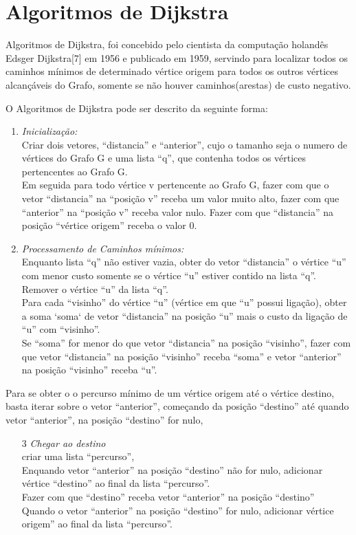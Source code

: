 \documentclass[a4paper,10pt]{article}
\begin{document}
\section{Algoritmos de Dijkstra}{
    

 Algoritmos de Dijkstra\cite{4}, foi concebido pelo cientista da computação holandês Edsger Dijkstra[7] em 1956 e publicado em 1959, servindo para localizar todos os caminhos mínimos
de determinado vértice origem para todos os outros vértices alcançáveis do Grafo, somente se não houver caminhos(arestas) de custo negativo.


O Algoritmos de Dijkstra pode ser descrito da seguinte forma:
\begin{enumerate}
 \item \textit{Inicialização:}
 \\Criar dois vetores, ``distancia'' e ``anterior'', cujo o tamanho seja o numero de vértices do Grafo G e uma lista ``q'', que contenha todos os vértices pertencentes ao Grafo G.
 \\Em seguida para todo vértice v pertencente ao Grafo G, fazer com que o vetor ``distancia'' na ``posição v'' 
receba um valor muito alto, fazer com que ``anterior'' na ``posição v'' receba valor nulo.
Fazer com que ``distancia'' na posição ``vértice origem'' receba o valor 0.

 
  \item \textit{Processamento de Caminhos mínimos:}
 \\Enquanto lista ``q'' não estiver vazia, obter do vetor ``distancia'' o vértice ``u'' com menor custo somente se o vértice ``u'' estiver contido na lista ``q''.
 \\Remover o vértice ``u'' da lista ``q''.
 \\Para cada ``visinho'' do vértice ``u'' (vértice em que ``u'' possui ligação), obter a soma `soma` de vetor ``distancia'' na posição ``u'' mais o custo da ligação de ``u'' com ``visinho''.
 \\Se ``soma'' for menor do que vetor ``distancia'' na posição ``visinho'', fazer com que vetor ``distancia'' na posição ``visinho'' receba ``soma'' e vetor ``anterior'' na posição ``visinho'' receba ``u''.
  
\end{enumerate}

 Para se obter o o percurso mínimo de um vértice origem até o vértice destino, basta iterar sobre o vetor ``anterior'', começando da posição ``destino'' até quando vetor ``anterior'', na posição ``destino'' for nulo,
\begin{enumerate} 
  \item[3] \textit{Chegar ao destino}
  \\criar uma lista ``percurso'',
  \\Enquando  vetor ``anterior'' na posição ``destino'' não for nulo, adicionar vértice ``destino'' ao final da lista ``percurso''.
  \\Fazer com que ``destino'' receba vetor ``anterior'' na posição ``destino''
  \\Quando o vetor ``anterior'' na posição ``destino'' for nulo, adicionar vértice origem'' ao final da lista ``percurso''.
\end{enumerate}

}
\end{document}
